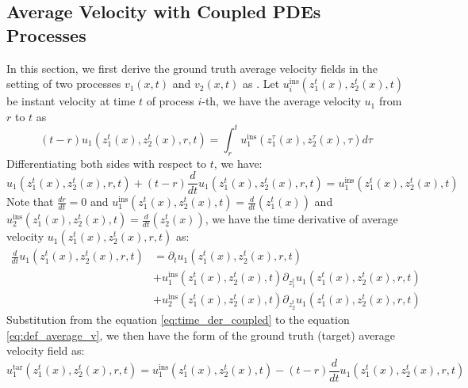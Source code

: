 \documentclass{article}
\begin{document}
\subsection{Average Velocity with Coupled PDEs Processes}
\label{sec:average_velocity_couple}
In this section, we first derive the ground truth average velocity fields in the setting of two processes $v_1(x, t)$ and $v_2(x, t)$ as \citep{geng2025mean}. Let $u^{\text{ins}}_i(z^t_1(x), z^t_2(x), t )$ be instant velocity at time $t$ of process $i$-th, we have the average velocity $u_1$ from $r$ to $t$ as 
\begin{equation}
    (t- r) u_1(z^t_1(x), z^t_2(x), r, t) = \int_{r}^t u^{\text{ins}}_1(z^\tau_1(x), z^\tau_2(x), \tau ) d\tau
\end{equation}
Differentiating both sides with respect to $t$, we have:
\begin{equation}
    u_1(z^t_1(x), z^t_2(x), r, t) + (t -r) \frac{d}{dt}  u_1(z^t_1(x), z^t_2(x), r, t)= u^{\text{ins}}_1(z^t_1(x), z^t_2(x), t ) \label{eq:def_average_v}
\end{equation}
Note that $\frac{dr}{dt} = 0$ and $u^{\text{ins}}_1(z^t_1(x), z^t_2(x), t ) = \frac{d}{dt} (z^t_1(x))$ and $u^{\text{ins}}_2(z^t_1(x), z^t_2(x), t ) = \frac{d}{dt} (z^t_2(x))$, we have the time derivative of average velocity $u_1(z^t_1(x), z^t_2(x), r, t)$ as: 
\begin{align}
    \frac{d}{dt}  u_1(z^t_1(x), z^t_2(x), r, t) &=\partial_t u_1(z^t_1(x), z^t_2(x), r, t) \label{eq:time_der_coupled} \\ \nonumber
    &+ u^{\text{ins}}_1( z^t_1(x), z^t_2(x), t ) \partial_{z_1^t} u_1 (z^t_1(x), z^t_2(x), r, t) \\ \nonumber
    &+u^{\text{ins}}_2(z^t_1(x), z^t_2(x), t ) \partial_{z_2^t} u_1 (z^t_1(x), z^t_2(x), r, t)
\end{align}
Substitution from the equation \ref{eq:time_der_coupled} to the equation \ref{eq:def_average_v}, we then have the form of the ground truth (target) average velocity field as: 
\begin{equation}
     u_1^{\text{tar}}(z^t_1(x), z^t_2(x), r, t) = u^{\text{ins}}_1(z^t_1(x), z^t_2(x), t ) - (t -r) \frac{d}{dt}  u_1(z^t_1(x), z^t_2(x), r, t) \label{eq:target_def_average_coupled_velocity}
\end{equation}
\end{document}
